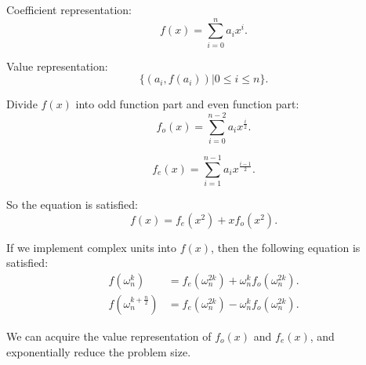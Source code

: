 

Coefficient representation:
$$
  f(x)=\sum_{i=0}^n a_i x^i.
$$

Value representation:
$$
  \{(a_i,f(a_i))|0\le i\le n\}.
$$

Divide $f(x)$ into odd function part and even function part:
$$
  f_o(x)=\sum_{i=0}^{n-2} a_i x^{\frac{i}{2}}.
$$

$$
  f_e(x)=\sum_{i=1}^{n-1} a_i x^{\frac{i-1}{2}}.
$$

So the equation is satisfied:
$$
  f(x)=f_e(x^2)+x f_o(x^2).
$$

If we implement complex units into $f(x)$, then the following equation is satisfied:
\begin{equation*}
  \begin{split}
    f(\omega_{n}^k)&=f_e(\omega_{n}^{2k})+\omega_{n}^k f_o(\omega_{n}^{2k}). \\
    f(\omega_{n}^{k+\frac{n}{2}})&=f_e(\omega_n^{2k})-\omega_{n}^k f_o(\omega_{n}^{2k}).
  \end{split}
\end{equation*}

We can acquire the value representation of $f_o(x)$ and $f_e(x)$, and exponentially reduce the problem size.